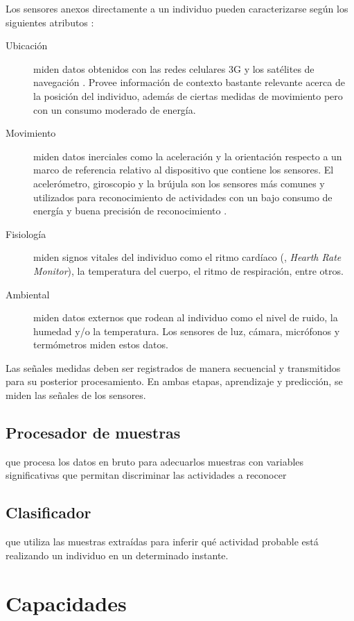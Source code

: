 Los sensores anexos directamente a un individuo pueden caracterizarse
según los siguientes atributos \cite{LaraLabrador2013}:
\begin{description}
\item [{Ubicación}] miden datos obtenidos con las redes celulares 3G y
los satélites de navegación . Provee información de contexto
bastante relevante acerca de la posición del individuo, además de
ciertas medidas de movimiento pero con un consumo moderado de energía.
\item [{Movimiento}] miden datos inerciales como la aceleración y la orientación
respecto a un marco de referencia relativo al dispositivo que contiene
los sensores. El acelerómetro, giroscopio y la brújula son los sensores
más comunes y utilizados para reconocimiento de actividades con un
bajo consumo de energía y buena precisión de reconocimiento \cite{Bao2004,LaraLabrador2012}.
\item [{Fisiología}] miden signos vitales del individuo como el ritmo cardíaco
(, \emph{Hearth Rate Monitor}), la temperatura del cuerpo,
el ritmo de respiración, entre otros.
\item [{Ambiental}] miden datos externos que rodean al individuo como el
nivel de ruido, la humedad y/o la temperatura. Los sensores de luz,
cámara, micrófonos y termómetros miden estos datos. 
\end{description}
Las señales medidas deben ser registrados de manera secuencial y transmitidos
para su posterior procesamiento. En ambas etapas, aprendizaje y predicción,
se miden las señales de los sensores.

\subsection{Procesador de muestras}

que procesa los datos en bruto para adecuarlos muestras con variables
significativas que permitan discriminar las actividades a reconocer

\subsection{Clasificador}

que utiliza las muestras extraídas para inferir qué actividad probable
está realizando un individuo en un determinado instante.

\section{Capacidades}

